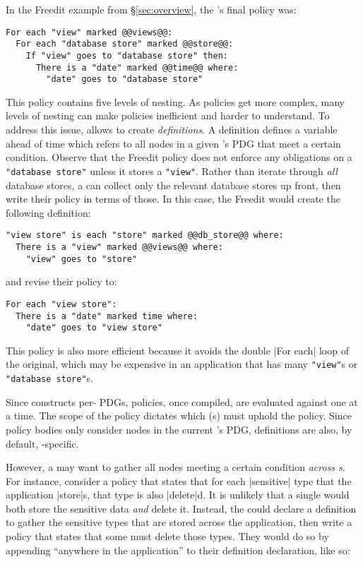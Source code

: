 In the Freedit example from \S\ref{sec:overview}, the \ce{}'s final policy was:
\begin{lstlisting}[language=CNL]
For each "view" marked @@views@@:
  For each "database store" marked @@store@@:
    If "view" goes to "database store" then:
      There is a "date" marked @@time@@ where:
        "date" goes to "database store"
\end{lstlisting}
This policy contains five levels of nesting.
%
As policies get more complex, many levels of nesting can make policies inefficient and harder to understand.
%
To address this issue, \syslang{} allows \ces{} to create \emph{definitions}.
%
A definition defines a variable ahead of time which refers to all nodes in a given \controller{}'s PDG that meet a certain condition.
%
Observe that the Freedit policy does not enforce any obligations on a \lstinline[language=CNL]|"database store"| unless it stores a \lstinline[language=CNL]|"view"|.
%
Rather than iterate through \emph{all} database stores, 
a \writer{} can collect only the relevant database stores up front,
then write their policy in terms of those.
%
In this case, the Freedit \ce{} would create the following definition:
\begin{lstlisting}[language=CNL]
"view store" is each "store" marked @@db_store@@ where:
  There is a "view" marked @@views@@ where:
    "view" goes to "store"
\end{lstlisting}
and revise their policy to:
\begin{lstlisting}[language=CNL]
For each "view store":
  There is a "date" marked time where:
    "date" goes to "view store" 
\end{lstlisting}
This policy is also more efficient because it avoids the double |For each| loop of the original,
which may be expensive in an application that has many \lstinline[language=CNL]|"view"|s or \lstinline[language=CNL]|"database store"|s.
%

Since \sys{} constructs per-\controller{} PDGs,
\syslang{} policies, once compiled, are evaluated against one \controller{} at a time.
%
The scope of the policy dictates which \controller{}(s) must uphold the policy.
%
Since policy bodies only consider nodes in the current \controller{}'s PDG,
definitions are also, by default, \controller{}-specific.

However, a \ce{} may want to gather all nodes meeting a certain condition \emph{across \controller{}s}.
%
For instance, consider a policy that states that for each |sensitive| type that the application |store|s,
that type is also |delete|d.
%
It is unlikely that a single \controller{} would both store the sensitive data \emph{and} delete it.
%
Instead, the \ce{} could declare a definition to gather the sensitive types that are stored across the application,
then write a policy that states that some \controller{} must delete those types.
%
They would do so by appending ``anywhere in the application'' to their definition declaration, like so:


